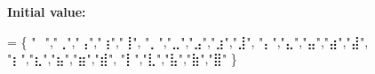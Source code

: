 {\bfseries Initial value\-:}
\begin{DoxyCode}
= \{
    \textcolor{stringliteral}{"⠀"},\textcolor{stringliteral}{"⢀"},\textcolor{stringliteral}{"⢠"},\textcolor{stringliteral}{"⢰"},\textcolor{stringliteral}{"⢸"},
    \textcolor{stringliteral}{"⡀"},\textcolor{stringliteral}{"⣀"},\textcolor{stringliteral}{"⣠"},\textcolor{stringliteral}{"⣰"},\textcolor{stringliteral}{"⣸"},
    \textcolor{stringliteral}{"⡄"},\textcolor{stringliteral}{"⣄"},\textcolor{stringliteral}{"⣤"},\textcolor{stringliteral}{"⣴"},\textcolor{stringliteral}{"⣼"},
    \textcolor{stringliteral}{"⡆"},\textcolor{stringliteral}{"⣆"},\textcolor{stringliteral}{"⣦"},\textcolor{stringliteral}{"⣶"},\textcolor{stringliteral}{"⣾"},
    \textcolor{stringliteral}{"⡇"},\textcolor{stringliteral}{"⣇"},\textcolor{stringliteral}{"⣧"},\textcolor{stringliteral}{"⣷"},\textcolor{stringliteral}{"⣿"} 
\}
\end{DoxyCode}
